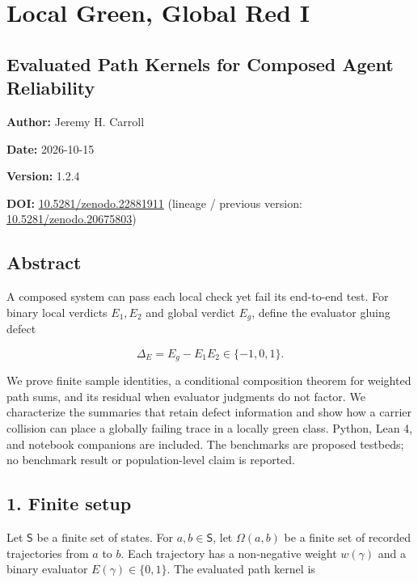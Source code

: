 \documentclass[
  11pt,
]{article}
\author{}
\date{}
\theoremstyle{plain}
\theoremstyle{definition}\newtheorem{definition}[theorem]{Definition}
\theoremstyle{remark}\newtheorem*{remark}{Remark}
\begin{document}
\section{Local Green, Global Red I}\label{local-green-global-red-i}

\subsection{Evaluated Path Kernels for Composed Agent Reliability}\label{evaluated-path-kernels-for-composed-agent-reliability}

\textbf{Author:} Jeremy H. Carroll

\textbf{Date:} 2026-10-15

\textbf{Version:} 1.2.4

\textbf{DOI:} \href{https://zenodo.org/records/22881911}{10.5281/zenodo.22881911} (lineage / previous version: \href{https://doi.org/10.5281/zenodo.20675803}{10.5281/zenodo.20675803})

\subsection{Abstract}\label{abstract}

A composed system can pass each local check yet fail its end-to-end test. For
binary local verdicts \(E_1,E_2\) and global verdict \(E_g\), define the
evaluator gluing defect

\[
\Delta_E=E_g-E_1E_2\in\{-1,0,1\}.
\]

We prove finite sample identities, a conditional composition theorem for
weighted path sums, and its residual when evaluator judgments do not factor.
We characterize the summaries that retain defect information and show how a
carrier collision can place a globally failing trace in a locally green class.
Python, Lean 4, and notebook companions are included. The benchmarks are
proposed testbeds; no benchmark result or population-level claim is reported.

\subsection{1. Finite setup}\label{finite-setup}

Let \(\mathsf S\) be a finite set of states. For \(a,b\in\mathsf S\), let
\(\Omega(a,b)\) be a finite set of recorded trajectories from \(a\) to \(b\).
Each trajectory has a non-negative weight \(w(\gamma)\) and a binary evaluator
\(E(\gamma)\in\{0,1\}\). The evaluated path kernel is
\end{document}
